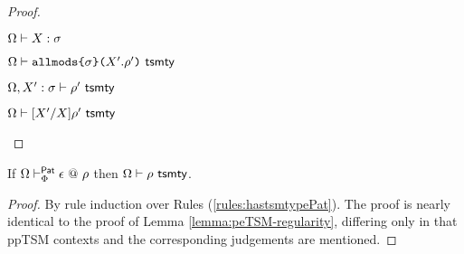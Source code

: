 \begin{proof}
\begin{byCases}
\begin{pfsteps*}
        \item $\Omega \vdash X : \sigma$  
        \item $\Omega \vdash \texttt{allmods}\texttt{\{}\sigma\texttt{\}(}X'.\rho'\texttt{)}~\mathsf{tsmty}$  
        \item $\Omega, X' : \sigma \vdash \rho'~\mathsf{tsmty}$  
        \item $\Omega \vdash [X'/X]\rho'~\mathsf{tsmty}$ 
      \end{pfsteps*}
      \resetpfcounter
  \end{byCases}
\end{proof}

\begin{lemma}
If $\Omega \vdash_{\Phi}^{\mathsf{Pat}} \epsilon ~@~ \rho$ then $\Omega \vdash \rho~\mathsf{tsmty}$.
\end{lemma}
\begin{proof}
By rule induction over Rules (\ref{rules:hastsmtypePat}). The proof is nearly identical to the proof of Lemma \ref{lemma:peTSM-regularity}, differing only in that ppTSM contexts and the corresponding judgements are mentioned.
\end{proof}

